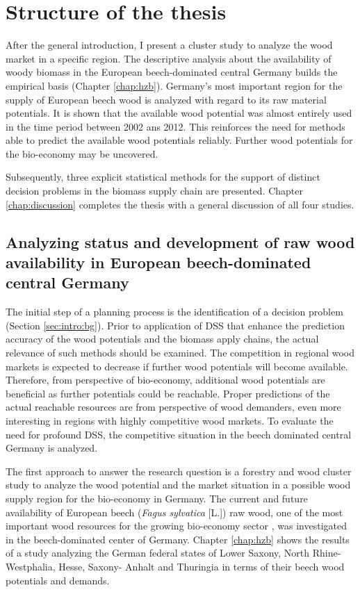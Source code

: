 \section{Structure of the thesis}
\label{sec:intro:struct}
After the general introduction, I present a cluster study to analyze the wood market in a specific region. The descriptive analysis about the availability of woody biomass in the European beech-dominated central Germany builds the empirical basis (Chapter \ref{chap:hzb}). Germany's most important region for the supply of European beech wood is analyzed with regard to its raw material potentials. It is shown that the available wood potential was almost entirely used in the time period between 2002 ans 2012. This reinforces the need for methods able to predict the available wood potentials reliably. Further wood potentials for the bio-economy may be uncovered.

Subsequently, three explicit statistical methods for the support of distinct decision problems in the biomass supply chain are presented. Chapter \ref{chap:discussion} completes the thesis with a general discussion of all four studies.

\subsection{Analyzing status and development of raw wood availability in European beech-dominated central Germany}
\label{subsec:intro:struct:hzb}
The initial step of a planning process is the identification of a decision problem (Section \ref{sec:intro:bg}). Prior to application of DSS that enhance the prediction accuracy of the wood potentials and the biomass apply chains, the actual relevance of such methods should be examined. The competition in regional wood markets is expected to decrease if further wood potentials will become available. Therefore, from perspective of bio-economy, additional wood potentials are beneficial as further potentials could be reachable. Proper predictions of the actual reachable resources are from perspective of wood demanders, even more interesting in regions with highly competitive wood markets. To evaluate the need for profound DSS, the competitive situation in the beech dominated central Germany is analyzed.

The first approach to answer the research question is a forestry and wood cluster study to analyze the wood potential and the market situation in a possible wood supply region for the bio-economy in Germany. The current and future availability of European beech (\textit{Fagus sylvatica} [L.]) raw wood, one of the most important wood resources for the growing bio-economy sector \citep[p. 16]{auer_2016}, was investigated in the beech-dominated center of Germany. Chapter \ref{chap:hzb} shows the results of a study analyzing the German federal states of Lower Saxony, North Rhine-Westphalia, Hesse, Saxony- Anhalt and Thuringia in terms of their beech wood potentials and demands.

